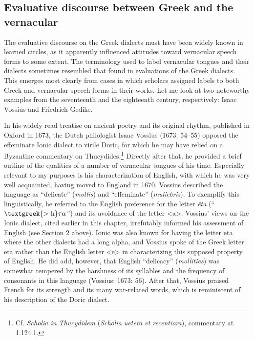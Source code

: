 \subsection{Evaluative discourse between Greek and the vernacular}
\hypertarget{Toc19704852}{}\begin{styleStandard}
The evaluative discourse on the Greek dialects must have been widely known in learned circles, as it apparently influenced attitudes toward vernacular speech forms to some extent. The terminology used to label vernacular tongues and their dialects sometimes resembled that found in evaluations of the Greek dialects. This emerges most clearly from cases in which scholars assigned labels to both Greek and vernacular speech forms in their works. Let me look at two noteworthy examples from the seventeenth and the eighteenth century, respectively: Isaac Vossius and Friedrich Gedike.
\end{styleStandard}

\begin{styleStandard}
In his widely read treatise on ancient poetry and its original rhythm, published in Oxford in 1673, the Dutch philologist Isaac Vossius (1673: 54–55) opposed the effeminate Ionic dialect to virile Doric, for which he may have relied on a Byzantine commentary on Thucydides.\footnote{ Cf. \textit{Scholia in Thucydidem} (\textit{Scholia uetera et recentiora}),\textit{ }commentary at 1.124.1.} Directly after that, he provided a brief outline of the qualities of a number of vernacular tongues of his time. Especially relevant to my purposes is his characterization of English, with which he was very well acquainted, having moved to England in 1670. Vossius described the language as “delicate” (\textit{mollis}) and “effeminate” (\textit{muliebris}). To exemplify this linguistically, he referred to the English preference for the letter \textit{êta} (“$\text{\textgreek{>~h}}\tau \alpha $”) and its avoidance of the letter {\textless}a{\textgreater}. Vossius’ views on the Ionic dialect, cited earlier in this chapter, irrefutably informed his assessment of English (see Section 2 above). Ionic was also known for having the letter eta where the other dialects had a long alpha, and Vossius spoke of the Greek letter eta rather than the English letter {\textless}e{\textgreater} in characterizing this supposed property of English. He did add, however, that English “delicacy” (\textit{mollities}) was somewhat tempered by the harshness of its syllables and the frequency of consonants in this language (Vossius: 1673: 56). After that, Vossius praised French for its strength and its many war-related words, which is reminiscent of his description of the Doric dialect.
\end{styleStandard}


